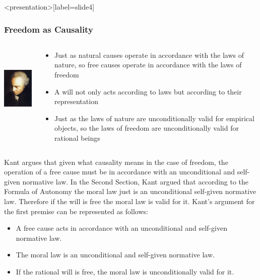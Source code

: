 \begin{frame}<presentation>[label=slide4]
    \frametitle{Freedom as Causality}
        \begin{columns}
            \begin{column}{3cm}
                \includegraphics[height=4cm]{../../graphics/kant.jpg}
            \end{column}
            \begin{column}{7cm}
                \begin{itemize}
                    \item Just as \alert{natural causes} operate in accordance with \alert{the laws of nature}, so \alert{free causes} operate in accordance with \alert{the laws of freedom}
                    \item A will not only acts according to laws but according to their representation
                    \item Just as the laws of nature are unconditionally valid for empirical objects, so the laws of freedom are unconditionally valid for rational beings
                \end{itemize}
            \end{column}
        \end{columns}
\end{frame}

Kant argues that given what causality means in the case of freedom, the operation of a free cause must be in accordance with an unconditional and self-given normative law. In the Second Section, Kant argued that according to the Formula of Autonomy the moral law just is an unconditional self-given normative law. Therefore if the will is free the moral law is valid for it. Kant’s argument for the first premise can be represented as follows:

\begin{itemize}
	\item A free cause acts in accordance with an unconditional and self-given normative law.
	\item The moral law is an unconditional and self-given normative law.
	\item If the rational will is free, the moral law is unconditionally valid for it.
\end{itemize}

